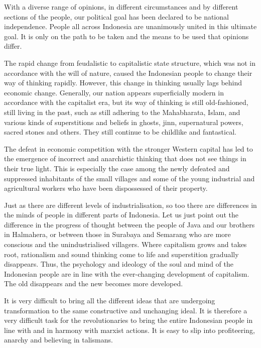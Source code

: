 With a diverse range of opinions, in different circumstances and by different sections of the people, 
our political goal has been declared to be national independence. People all across Indonesia are 
unanimously united in this ultimate goal. It is only on the path to be taken and the means to be used that opinions differ.\nline

The rapid change from feudalistic to capitalistic state structure, which was not in accordance with the will of nature, 
caused the Indonesian people to change their way of thinking rapidly. However, this change in thinking usually lags behind 
economic change. Generally, our nation appears superficially modern in accordance with the capitalist era, but its way of 
thinking is still old-fashioned, still living in the past, such as still adhering to the Mahabharata, Islam, and various kinds 
of superstitions and beliefs in ghosts, jinn, supernatural powers, sacred stones and others. They still continue to be childlike 
and fantastical.\nline

The defeat in economic competition with the stronger Western capital has led to the emergence of incorrect and anarchistic 
thinking that does not see things in their true light. This is especially the case among the newly defeated and suppressed 
inhabitants of the small villages and some of the young industrial and agricultural workers who have been dispossessed of their property.\nline

Just as there are different levels of industrialisation, so too there are differences in the minds of people in different parts of 
Indonesia. Let us just point out the difference in the progress of thought between the people of Java and our brothers in Halmahera, 
or between those in Surabaya and Semarang who are more conscious and the unindustrialised villagers. Where capitalism grows 
and takes root, rationalism and sound thinking come to life and superstition gradually disappears. Thus, the psychology 
and ideology of the soul and mind of the Indonesian people are in line with the ever-changing development of capitalism. 
The old disappears and the new becomes more developed.\nline

It is very difficult to bring all the different ideas that are undergoing transformation to the same 
constructive and unchanging ideal. It is therefore a very difficult task for the revolutionaries to bring the entire 
Indonesian people in line with and in harmony with marxist actions. It is easy to slip into profiteering, anarchy and 
believing in talismans.\nline

